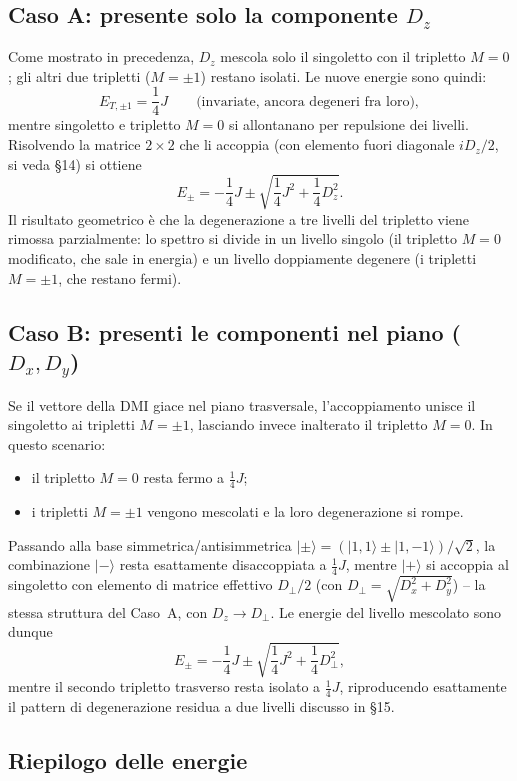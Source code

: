 \documentclass[11pt,a4paper]{article}
\begin{document}
\subsection{Caso A: presente solo la componente $D_z$}

Come mostrato in precedenza, $D_z$ mescola solo il singoletto con il tripletto $M=0$;
gli altri due tripletti ($M=\pm1$) restano isolati. Le nuove energie sono quindi:
$$E_{T,\pm1} = \frac14 J \qquad \text{(invariate, ancora degeneri fra loro)},$$
mentre singoletto e tripletto $M=0$ si allontanano per repulsione dei livelli.
Risolvendo la matrice $2\times2$ che li accoppia (con elemento fuori diagonale
$iD_z/2$, si veda \S14) si ottiene
$$E_\pm = -\frac14 J \pm \sqrt{\frac14 J^2 + \frac14 D_z^2}.$$
Il risultato geometrico \`e che la degenerazione a tre livelli del tripletto viene
rimossa parzialmente: lo spettro si divide in un livello singolo (il tripletto $M=0$
modificato, che sale in energia) e un livello doppiamente degenere (i tripletti
$M=\pm1$, che restano fermi).

\subsection{Caso B: presenti le componenti nel piano ($D_x,D_y$)}

Se il vettore della DMI giace nel piano trasversale, l'accoppiamento unisce il
singoletto ai tripletti $M=\pm1$, lasciando invece inalterato il tripletto $M=0$. In
questo scenario:
\begin{itemize}
\item il tripletto $M=0$ resta fermo a $\tfrac14 J$;
\item i tripletti $M=\pm1$ vengono mescolati e la loro degenerazione si rompe.
\end{itemize}
Passando alla base simmetrica/antisimmetrica $|{\pm}\rangle=(|1,1\rangle\pm|1,-1\rangle)/\sqrt2$,
la combinazione $|{-}\rangle$ resta esattamente disaccoppiata a $\tfrac14 J$, mentre
$|{+}\rangle$ si accoppia al singoletto con elemento di matrice effettivo
$D_\perp/2$ (con $D_\perp=\sqrt{D_x^2+D_y^2}$) -- la stessa struttura del Caso~A, con
$D_z\to D_\perp$. Le energie del livello mescolato sono dunque
$$E_\pm = -\frac14 J \pm \sqrt{\frac14 J^2 + \frac14 D_\perp^2},$$
mentre il secondo tripletto trasverso resta isolato a $\tfrac14 J$, riproducendo
esattamente il pattern di degenerazione residua a due livelli discusso in \S15.

\subsection{Riepilogo delle energie}
\end{document}
